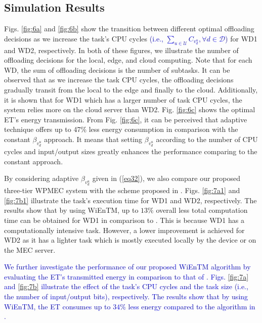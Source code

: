 \documentclass[12pt,draftclsnofoot,onecolumn]{IEEEtran}
\begin{document}
\subsection{Simulation Results}
Figs. \ref{fig:6a} and \ref{fig:6b} show the transition between different optimal offloading decisions as we increase the task's CPU cycles \textcolor{blue}{(i.e., $\sum_{u\in\mathcal{U}}C_{v_d^u}, \forall d\in\mathcal{D}$)} for WD1 and WD2, respectively. In both of these figures, we illustrate the number of offloading decisions for the local, edge, and cloud computing. Note that for each WD, the sum of offloading decisions is the number of subtasks. It can be observed that as we increase the task CPU cycles, the offloading decisions gradually transit from the local to the edge and finally to the cloud. Additionally, it is shown that for WD1 which has a larger number of task CPU cycles, the system relies more on the cloud server than WD2. Fig. \ref{fig:6c} shows the  optimal ET’s energy transmission. From Fig. \ref{fig:6c}, it can be perceived that adaptive technique offers up to 47\% less energy consumption in comparison with the constant $\beta_{v_d^u}$ approach. It means that setting $\beta_{v_d^u}$ according to the number of CPU cycles and input/output sizes greatly enhances the performance comparing to the constant approach.

By considering adaptive $\beta_{v_d^u}$ given in (\ref{eq32}), we also compare our proposed three-tier WPMEC system with the scheme proposed in \cite{b13}. Figs. \ref{fig:7a1} and \ref{fig:7b1} illustrate the task's execution time for WD1 and WD2, respectively. The results show that by using WiEnTM, up to $13\%$ overall less total computation time can be obtained for WD1 in comparison to \cite{b13}. This is because WD1 has a computationally intensive task. However, a lower improvement is achieved for WD2 as it has a lighter task which is mostly executed locally by the device or on the MEC server.

\textcolor{blue}{We further investigate the performance of our proposed WiEnTM algorithm by evaluating the ET's transmitted energy in comparison to that of \cite{b13}. Figs. \ref{fig:7a} and \ref{fig:7b} illustrate the effect of the task's CPU cycles and the task size (i.e., the number of input/output bits), respectively. The results show that by using WiEnTM, the ET consumes up to $34\%$ less energy compared to the algorithm in \cite{b13}.}
\end{document}
